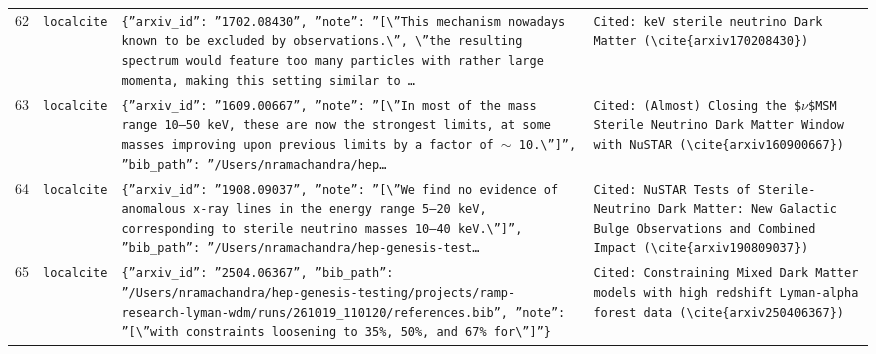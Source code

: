\documentclass[11pt,a4paper]{article}
\begin{document}
\begin{longtable}{@{}p{}p{}p{}p{}@{}}
62 & \texttt{local}\newline\texttt{cite} & \texttt{\{''arxiv\_\allowbreak{}id'':\allowbreak{} ''1702.08430'',\allowbreak{} ''note'':\allowbreak{} ''[\textbackslash{}\allowbreak{}''This mechanism nowadays known to be excluded by observations.\textbackslash{}\allowbreak{}'',\allowbreak{} \textbackslash{}\allowbreak{}''the resulting spectrum would feature too many particles with rather large momenta,\allowbreak{} making this setting similar to \ldots{}\allowbreak{}} & \texttt{Cited:\allowbreak{} keV sterile neutrino Dark Matter (\textbackslash{}\allowbreak{}cite\{arxiv170208430\}\allowbreak{})\allowbreak{}} \\
63 & \texttt{local}\newline\texttt{cite} & \texttt{\{''arxiv\_\allowbreak{}id'':\allowbreak{} ''1609.00667'',\allowbreak{} ''note'':\allowbreak{} ''[\textbackslash{}\allowbreak{}''In most of the mass range 10--50 keV,\allowbreak{} these are now the strongest limits,\allowbreak{} at some masses improving upon previous limits by a factor of $\sim$ 10.\textbackslash{}\allowbreak{}'']\allowbreak{}'',\allowbreak{} ''bib\_\allowbreak{}path'':\allowbreak{} ''/\allowbreak{}Users/\allowbreak{}nramachandra/\allowbreak{}hep\ldots{}\allowbreak{}} & \texttt{Cited:\allowbreak{} (Almost)\allowbreak{} Closing the \$$\nu$\$MSM Sterile Neutrino Dark Matter Window with NuSTAR (\textbackslash{}\allowbreak{}cite\{arxiv160900667\}\allowbreak{})\allowbreak{}} \\
64 & \texttt{local}\newline\texttt{cite} & \texttt{\{''arxiv\_\allowbreak{}id'':\allowbreak{} ''1908.09037'',\allowbreak{} ''note'':\allowbreak{} ''[\textbackslash{}\allowbreak{}''We find no evidence of anomalous x-ray lines in the energy range 5--20 keV,\allowbreak{} corresponding to sterile neutrino masses 10--40 keV.\textbackslash{}\allowbreak{}'']\allowbreak{}'',\allowbreak{} ''bib\_\allowbreak{}path'':\allowbreak{} ''/\allowbreak{}Users/\allowbreak{}nramachandra/\allowbreak{}hep-genesis-test\ldots{}\allowbreak{}} & \texttt{Cited:\allowbreak{} NuSTAR Tests of Sterile-Neutrino Dark Matter:\allowbreak{} New Galactic Bulge Observations and Combined Impact (\textbackslash{}\allowbreak{}cite\{arxiv190809037\}\allowbreak{})\allowbreak{}} \\
65 & \texttt{local}\newline\texttt{cite} & \texttt{\{''arxiv\_\allowbreak{}id'':\allowbreak{} ''2504.06367'',\allowbreak{} ''bib\_\allowbreak{}path'':\allowbreak{} ''/\allowbreak{}Users/\allowbreak{}nramachandra/\allowbreak{}hep-genesis-testing/\allowbreak{}projects/\allowbreak{}ramp-research-lyman-wdm/\allowbreak{}runs/\allowbreak{}261019\_\allowbreak{}110120/\allowbreak{}references.bib'',\allowbreak{} ''note'':\allowbreak{} ''[\textbackslash{}\allowbreak{}''with constraints loosening to 35\%,\allowbreak{} 50\%,\allowbreak{} and 67\% for\textbackslash{}\allowbreak{}'']\allowbreak{}''\}\allowbreak{}} & \texttt{Cited:\allowbreak{} Constraining Mixed Dark Matter models with high redshift Lyman-alpha forest data (\textbackslash{}\allowbreak{}cite\{arxiv250406367\}\allowbreak{})\allowbreak{}} \\

\end{longtable}
\end{document}
